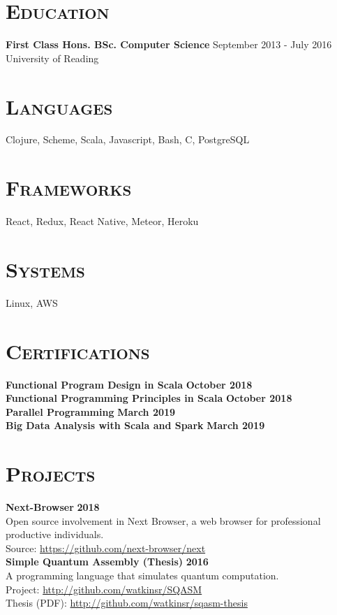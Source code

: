 \documentclass[line, margin, 10pt]{res}
\begin{document}
\begin{resume}
\section{\textsc{Education}}
{\bf First Class Hons. BSc. Computer Science}  {\hfill September 2013 - July 2016}\\
University of Reading

\section{\textsc{Languages}}
Clojure, Scheme, Scala, Javascript, Bash, C, PostgreSQL

\section{\textsc{Frameworks}}
React, Redux, React Native, Meteor, Heroku

\section{\textsc {Systems}}
Linux, AWS \\

\section{\textsc{Certifications}}
{\bf Functional Program Design in Scala} {\bf \hfill October 2018}\\
{\bf Functional Programming Principles in Scala} {\bf \hfill October 2018}\\
{\bf Parallel Programming} {\bf \hfill March 2019}\\
{\bf Big Data Analysis with Scala and Spark} {\bf \hfill March 2019}\\

\newpage
\section{\textsc{Projects}}

{\bf Next-Browser} {\bf \hfill 2018}\\
Open source involvement in Next Browser, a web browser for professional productive individuals.\\
Source: \url{https://github.com/next-browser/next}\\

{\bf Simple Quantum Assembly (Thesis)} {\bf \hfill 2016}\\
A programming language that simulates quantum computation.\\
Project: \url{http://github.com/watkinsr/SQASM}\\
Thesis (PDF): \url{http://github.com/watkinsr/sqasm-thesis}\\


\end{resume}
\end{document}
